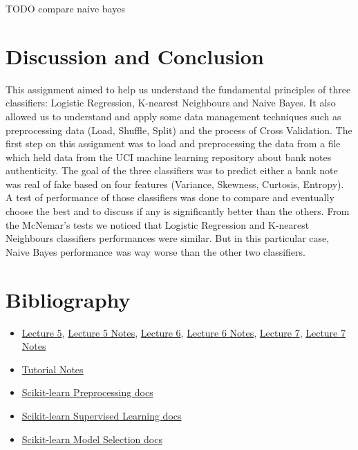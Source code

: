 \documentclass[a4paper]{article}
\begin{document}
  TODO compare naive bayes 


\section{Discussion and Conclusion}
This assignment aimed to help us understand the fundamental principles of three 
classifiers: Logistic Regression, K-nearest Neighbours and Naive Bayes. 
It also allowed us to understand and apply some data management techniques 
such as preprocessing data (Load, Shuffle, Split) and the process of Cross Validation. 
The first step on this assignment was to load and preprocessing the data from a 
file which held data from the UCI machine learning repository about bank notes 
authenticity. The goal of the three classifiers was to predict either a bank note 
was real of fake based on four features (Variance, Skewness, Curtosis, Entropy).
A test of performance of those classifiers was done to compare and eventually 
choose the best and to discuss if any is significantly better than the others. 
From the McNemar's tests we noticed that Logistic Regression and K-nearest 
Neighbours classifiers performances were similar. But in this particular case, 
Naive Bayes performance was way worse than the other two classifiers.
  

\section{Bibliography}
\begin{itemize}
\item \href{http://aa.ssdi.di.fct.unl.pt/files/AA-05.pdf}{Lecture 5}, 
	\href{http://aa.ssdi.di.fct.unl.pt/files/AA-05_notes.pdf}{Lecture 5 Notes}, 
	\href{http://aa.ssdi.di.fct.unl.pt/files/AA-06.pdf}{Lecture 6}, 
	\href{http://aa.ssdi.di.fct.unl.pt/files/AA-06_notes.pdf}{Lecture 6 Notes}, 
	\href{http://aa.ssdi.di.fct.unl.pt/files/AA-07.pdf}{Lecture 7}, 
	\href{http://aa.ssdi.di.fct.unl.pt/files/AA-07_notes.pdf}{Lecture 7 Notes}\\
\item \href{http://aa.ssdi.di.fct.unl.pt/files/Tutorials.pdf}{Tutorial Notes}\\
\item \href{http://scikit-learn.org/stable/modules/preprocessing.html#preprocessing}{Scikit-learn Preprocessing docs}\\
\item \href{http://scikit-learn.org/stable/supervised_learning.html#supervised-learning}{Scikit-learn Supervised Learning docs}\\
\item \href{http://scikit-learn.org/stable/model_selection.html#model-selection}{Scikit-learn Model Selection docs}\\
\end{itemize}
\end{document}
